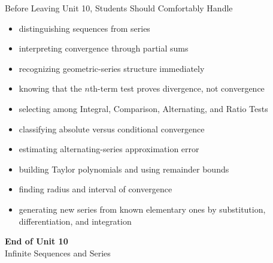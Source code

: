 \documentclass[11pt]{article}
\begin{document}
\begin{theorybox}{Before Leaving Unit 10, Students Should Comfortably Handle}
\begin{itemize}
    \item distinguishing sequences from series
    \item interpreting convergence through partial sums
    \item recognizing geometric-series structure immediately
    \item knowing that the \(n\)th-term test proves divergence, not convergence
    \item selecting among Integral, Comparison, Alternating, and Ratio Tests
    \item classifying absolute versus conditional convergence
    \item estimating alternating-series approximation error
    \item building Taylor polynomials and using remainder bounds
    \item finding radius and interval of convergence
    \item generating new series from known elementary ones by substitution, differentiation, and integration
\end{itemize}
\end{theorybox}

\vfill
\begin{center}
{\Large\color{novelPurpleDark}\textbf{End of Unit 10}}\\[0.35em]
{\large Infinite Sequences and Series}
\end{center}
\end{document}
